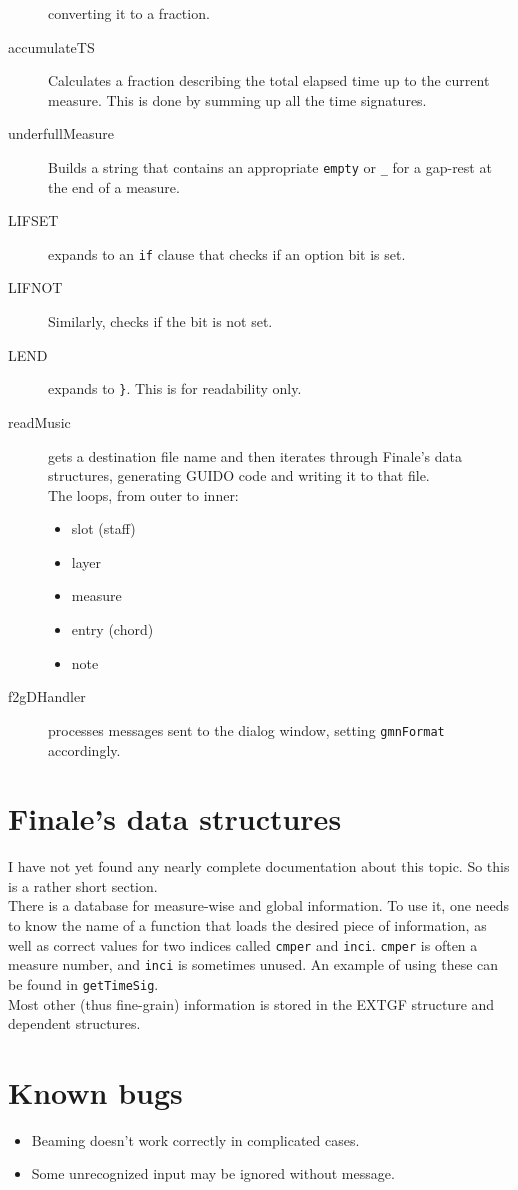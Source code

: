 \documentclass{article}
\begin{document}
\begin{description}
converting it to a fraction.
\item[accumulateTS] Calculates a fraction describing the total elapsed time
up to the current measure. This is done by summing up all the time signatures.
\item[underfullMeasure] Builds a string that contains an appropriate
\verb"empty" or \verb"_" for a gap-rest at the end of a measure.
\item[LIFSET] expands to an \verb"if" clause that checks if an option bit is set.
\item[LIFNOT] Similarly, checks if the bit is not set.
\item[LEND] expands to \verb"}". This is for readability only.
\item[readMusic] gets a destination file name and then iterates through
Finale's data structures, generating GUIDO code and writing it to that file.\\
The loops, from outer to inner:
\begin{itemize}
\item slot (staff)
\item layer
\item measure
\item entry (chord)
\item note
\end{itemize}
\item[f2gDHandler] processes messages sent to the dialog window, setting
\verb"gmnFormat" accordingly.
\end{description}

\section{Finale's data structures}
I have not yet found any nearly complete documentation about this topic. So this is a
rather short section.\\
There is a database for measure-wise and global information. To use it, one needs
to know the name of a function that loads the desired piece of information, as well
as correct values for two indices called \verb"cmper" and \verb"inci". \verb"cmper"
is often a measure number, and \verb"inci" is sometimes unused.
An example of using these can be found in \verb"getTimeSig".\\
Most other (thus fine-grain) information is stored in the EXTGF structure and
dependent structures.

\section{Known bugs}
\begin{itemize}
\item Beaming doesn't work correctly in complicated cases.
\item Some unrecognized input may be ignored without message.
\end{itemize}
\end{document}

